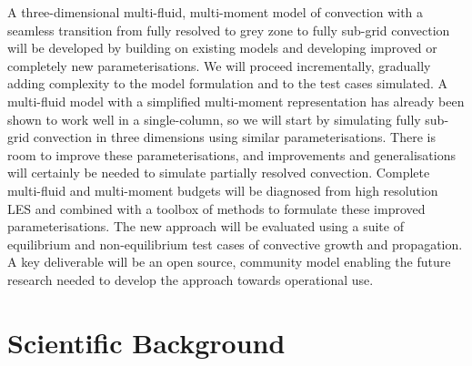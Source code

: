 \documentclass[11pt,a4paper]{article}
\begin{document}
A three-dimensional multi-fluid, multi-moment model of convection with a seamless transition from fully resolved to grey zone to fully sub-grid convection will be developed by building on existing models and developing improved or completely new parameterisations. We will proceed incrementally, gradually adding complexity to the model formulation and to
the test cases simulated.
A multi-fluid model with a simplified multi-moment representation has already been shown to work well in a single-column, so we will start by simulating fully sub-grid convection in three dimensions using similar parameterisations.
There is room to improve these parameterisations, and improvements and generalisations will certainly be needed
to simulate partially resolved convection. Complete multi-fluid and multi-moment budgets will be diagnosed from
high resolution LES and combined with a toolbox of methods to formulate these improved parameterisations.
The new approach will be evaluated using a suite of equilibrium and non-equilibrium test cases of convective growth and propagation. A key deliverable will be an open source, community model enabling the future research needed to develop the approach towards operational use.




\section{Scientific Background}

\end{document}
